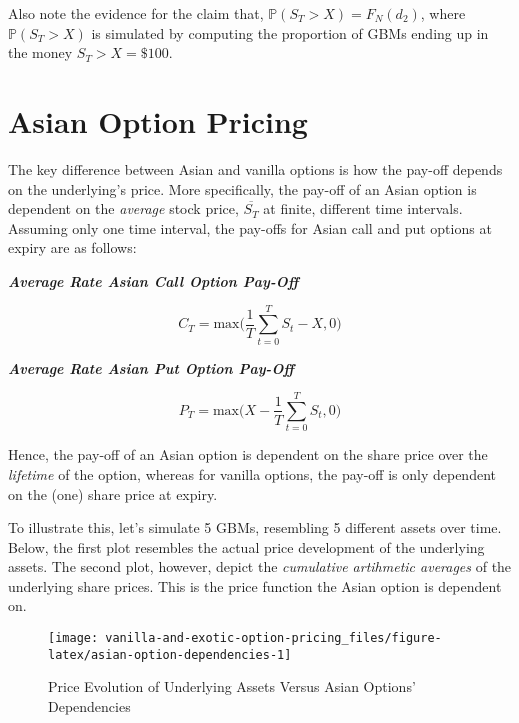 \documentclass[
  12pt,
]{article}
\begin{document}
Also note the evidence for the claim that,
\(\mathbb{P}(S_T > X) = F_N(d_2)\), where \(\mathbb{P}(S_T > X)\) is
simulated by computing the proportion of GBMs ending up in the money
\(S_T > X = \$100\).

\hypertarget{asian-option-pricing}{%
\section{Asian Option Pricing}\label{asian-option-pricing}}

The key difference between Asian and vanilla options is how the pay-off
depends on the underlying's price. More specifically, the pay-off of an
Asian option is dependent on the \emph{average} stock price,
\(\overline{S_T}\) at finite, different time intervals. Assuming only
one time interval, the pay-offs for Asian call and put options at expiry
are as follows:

\textbf{\emph{Average Rate Asian Call Option Pay-Off}}

\[C_T = \text{max} \bigg( \frac{1}{T} \sum_{t=0}^{T} S_t - X,0 \bigg)\]

\textbf{\emph{Average Rate Asian Put Option Pay-Off}}

\[P_T = \text{max} \bigg(X - \frac{1}{T} \sum_{t=0}^{T} S_t,0 \bigg)\]

Hence, the pay-off of an Asian option is dependent on the share price
over the \emph{lifetime} of the option, whereas for vanilla options, the
pay-off is only dependent on the (one) share price at expiry.

To illustrate this, let's simulate 5 GBMs, resembling 5 different assets
over time. Below, the first plot resembles the actual price development
of the underlying assets. The second plot, however, depict the
\emph{cumulative artihmetic averages} of the underlying share prices.
This is the price function the Asian option is dependent on.

\vspace{3mm}

\begin{figure}[H]

{\centering \texttt{[image: vanilla-and-exotic-option-pricing\_files/figure-latex/asian-option-dependencies-1]} 

}

\caption{Price Evolution of Underlying Assets Versus Asian Options' Dependencies}\label{fig:asian-option-dependencies}
\end{figure}
\end{document}
